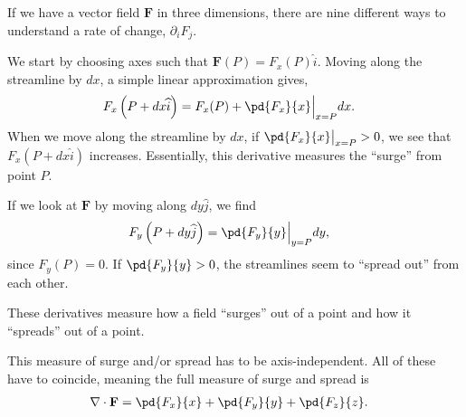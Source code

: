 \documentclass[10pt]{mypackage}
\begin{document}
\begin{example}
  If we have a vector field $\mathbf{F}$ in three dimensions, there are nine different ways to understand a rate of change, $\partial_{i}F_{j}$.\newline

  We start by choosing axes such that $\mathbf{F}(P) = F_x(P)\widehat{i}$. Moving along the streamline by $dx$, a simple linear approximation gives,
  \begin{align*}
    F_{x}\left(P + dx\widehat{i}\right) &= F_x(P) + \pd{F_x}{x}\Bigr\vert_{x=P} dx.
  \end{align*}
  When we move along the streamline by $dx$, if $\pd{F_x}{x}\bigr\vert_{x=P} > 0$, we see that $F_x\left(P + dx\widehat{i}\right)$ increases. Essentially, this derivative measures the ``surge'' from point $P$.\newline

  If we look at $\mathbf{F}$ by moving along $dy \widehat{j}$, we find
  \begin{align*}
    F_y\left(P + dy\widehat{j}\right) &= \pd{F_y}{y}\Bigr\vert_{y=P}dy,
  \end{align*}
  since $F_y(P) = 0$. If $\pd{F_y}{y} > 0$, the streamlines seem to ``spread out'' from each other.\newline

  These derivatives measure how a field ``surges'' out of a point and how it ``spreads'' out of a point.\newline

  This measure of surge and/or spread has to be axis-independent. All of these have to coincide, meaning the full measure of surge and spread is
  \begin{align*}
    \nabla \cdot \mathbf{F} &= \pd{F_x}{x} + \pd{F_y}{y} + \pd{F_z}{z}.
  \end{align*}
\end{example}
\end{document}
